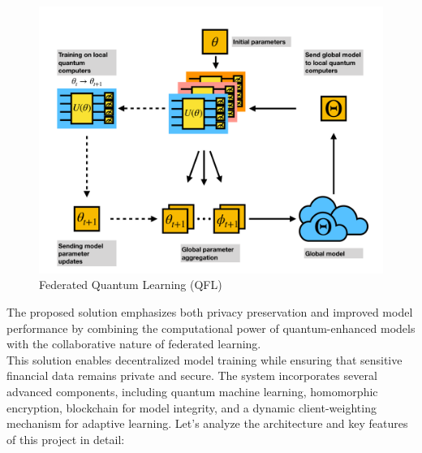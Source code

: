 \documentclass[10pt]{article}
\begin{document}
\begin{figure}[h!]
	\centering
	\includegraphics[height = 0.30\textheight]{img/QFL.png}
	\caption{Federated Quantum Learning (QFL)}
\end{figure}
The proposed solution emphasizes both privacy preservation and improved model performance by combining the computational power of quantum-enhanced models with the collaborative nature of federated learning.\\
This solution enables decentralized model training while ensuring that sensitive financial data remains private and secure. The system incorporates several advanced components, including quantum machine learning, homomorphic encryption, blockchain for model integrity, and a dynamic client-weighting mechanism for adaptive learning.
Let's analyze the architecture and key features of this project in detail:
\end{document}
